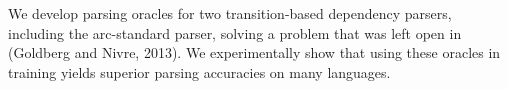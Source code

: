 We develop parsing oracles for two transition-based dependency parsers, including the arc-standard parser, solving a problem that was left open in (Goldberg and Nivre, 2013). We experimentally show that using these oracles in training yields superior parsing accuracies on many languages.
